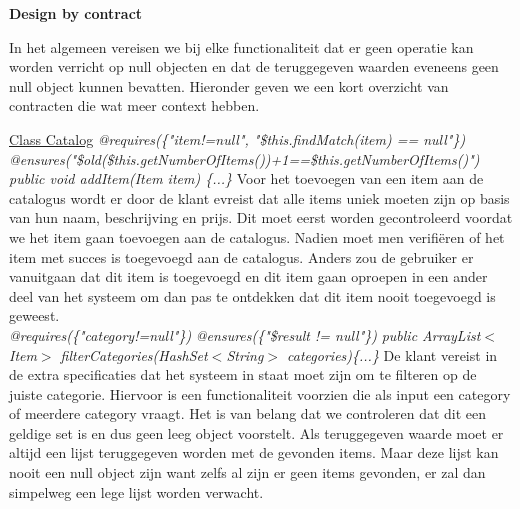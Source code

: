 \documentclass{article}
\begin{document}
\newpage
\maketitle
\noindent
\textbf{Design by contract} \newline
\newline

\maketitle
\noindent
In het algemeen vereisen we bij elke functionaliteit dat er geen operatie kan worden verricht op null objecten en dat de teruggegeven waarden eveneens geen null object kunnen bevatten. Hieronder geven we een kort overzicht van contracten die wat meer context hebben.\newline
\newline

\noindent
\underline{Class Catalog}\newline
\textit{@requires(\{"item!=null", "\$this.findMatch(item) == null"\})}\newline
\textit{@ensures("\$old(\$this.getNumberOfItems())+1==\$this.getNumberOfItems()")}\newline
\textit{public void addItem(Item item) \{...\}}\newline
Voor het toevoegen van een item aan de catalogus wordt er door de klant evreist dat alle items uniek moeten zijn op basis van hun naam, beschrijving en prijs. Dit moet eerst worden gecontroleerd voordat we het item gaan toevoegen aan de catalogus. Nadien moet men verifi\"{e}ren of het item met succes is toegevoegd aan de catalogus. Anders zou de gebruiker er vanuitgaan dat dit item is toegevoegd en dit item gaan oproepen in een ander deel van het systeem om dan pas te ontdekken dat dit item nooit toegevoegd is geweest.\\

\noindent
\textit{@requires(\{"category!=null"\})}\newline
\textit{@ensures(\{"\$result != null"\})}\newline
\textit{public ArrayList$<$Item$>$ filterCategories(HashSet$<$String$>$ categories)\{...\}}\newline
De klant vereist in de extra specificaties dat het systeem in staat moet zijn om te filteren op de juiste categorie. Hiervoor is een functionaliteit voorzien die als input een category of meerdere category vraagt. Het is van belang dat we controleren dat dit een geldige set is en dus geen leeg object voorstelt. Als teruggegeven waarde moet er altijd een lijst teruggegeven worden met de gevonden items. Maar deze lijst kan nooit een null object zijn want zelfs al zijn er geen items gevonden, er zal dan simpelweg een lege lijst worden verwacht. \\
\end{document}
